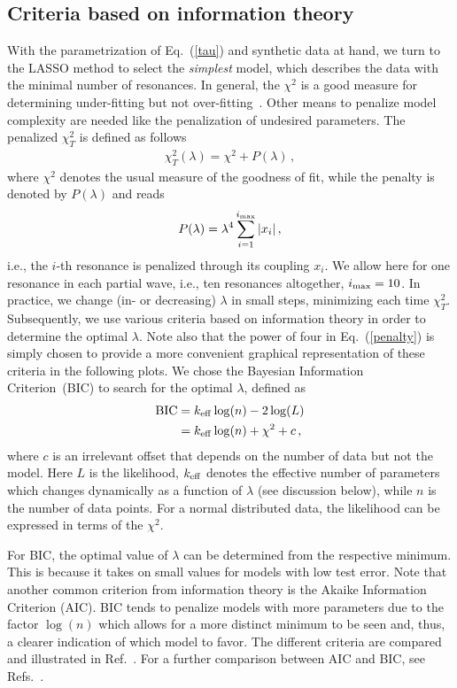 \documentclass[10pt,aps,prc,superscriptaddress,twoside,twocolumn,nofootinbib,showpacs,preprintnumbers]{revtex4-1}
\newcommand{\be}{\begin{eqnarray}}
\newcommand{\ee}{\end{eqnarray}}
\begin{document}
\subsection{Criteria based on information theory}
With the parametrization of Eq.~(\ref{tau}) and synthetic data at hand, we turn to the LASSO method to select the \textit{simplest} model, which describes the data with the minimal number of resonances. In general, the $\chi^2$ is a good measure for determining under-fitting but not over-fitting~\cite{Landay:2016cjw}. Other means to penalize model complexity are needed like the penalization of undesired parameters.
The penalized $\chi_T^2$ is defined as follows
\be
\chi^2_T(\lambda)=\chi^2+P(\lambda)\,,
\label{totalchi}
\ee
where $\chi^2$ denotes the usual measure of the goodness of fit, while the penalty is denoted by $P(\lambda)$ and reads 
\be
P(\lambda)=\lambda^4\sum_{i=1}^{i_{\rm max}} |x_i|\,,
\label{penalty}
\ee
i.e., the $i$-th resonance is penalized through its coupling $x_i$. We allow here for one resonance in each partial wave, i.e., ten resonances altogether, $i_{\rm max}=10$.
In practice, we change (in- or decreasing) $\lambda$ in small steps, minimizing each time $\chi_T^2$. Subsequently, we use various criteria based on information theory in order to determine the optimal $\lambda$. Note also that the power of four in Eq.~(\ref{penalty}) is simply chosen to provide a more convenient graphical representation of these criteria in the following plots. We chose the Bayesian Information Criterion~(BIC) to search for the optimal $\lambda$, defined as
\begin{align}
\text{BIC} &= k_{\rm eff}\log(n) -2\log(L)
\nonumber\\
&= k_{\rm eff}\log(n) + \chi^2+c\,,
\label{eq:BIC}
\end{align}
where $c$ is an irrelevant offset that depends on the number of data but not the model. Here $L$ is the likelihood, $k_{\rm eff}$ denotes the effective number of parameters which changes dynamically as a function of $\lambda$ (see discussion below), while $n$ is the number of data points.
For a normal distributed data, the likelihood can be expressed in terms of the $\chi^2$.

For BIC, the optimal value of $\lambda$ can be determined from the respective minimum. This is because it takes on small values for models with low test error. Note that another common criterion from information theory is the Akaike Information Criterion (AIC). BIC tends to penalize models with more parameters due to the factor $\log (n)$ which allows for a more distinct minimum to be seen and, thus, a clearer indication of which model to favor. The different criteria are compared and illustrated in Ref.~\cite{Landay:2016cjw}. For a further comparison between AIC and BIC, see Refs.~\cite{Tibshirani2011, james2013an}.
\end{document}
